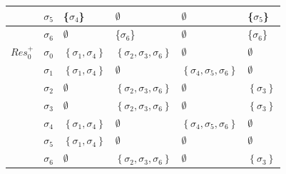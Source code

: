 \documentclass[11pt,a4paper]{article}
\begin{document}
\begin{table}[ht!]
\begin{tabular}{|l|l|l|l|l|l|}
     & $\sigma_5$ &  \{$\sigma_4$\}  & $\emptyset$ & $\emptyset$   &  \{$\sigma_5$\}  \\ \hline
     & $\sigma_6$ &  $\emptyset$  & \{$\sigma_6$\} & $\emptyset$   &  \{$\sigma_6$\} \\ \hline
$Res_0^+$ & $\sigma_0$ & $\left\{\sigma_1, \sigma_4\right\}$  & $\left\{\sigma_2, \sigma_3,\sigma_6\right\}$ & $\emptyset$ & $\emptyset$   \\ \hline
     & $\sigma_1$ &  $\left\{\sigma_1, \sigma_4\right\}$  & $\emptyset$ & $\left\{\sigma_4, \sigma_5,\sigma_6\right\}$  &  $\emptyset$  \\ \hline
     & $\sigma_2$ &  $\emptyset$  & $\left\{\sigma_2, \sigma_3,\sigma_6\right\}$ & $\emptyset$   &  $\left\{\sigma_3\right\}$ \\ \hline
     & $\sigma_3$ &  $\emptyset$  & $\left\{\sigma_2, \sigma_3,\sigma_6\right\}$ & $\emptyset$   &  $\left\{\sigma_3\right\}$ \\ \hline
     & $\sigma_4$ &  $\left\{\sigma_1, \sigma_4\right\}$  & $\emptyset$ & $\left\{\sigma_4, \sigma_5,\sigma_6\right\}$   &  $\emptyset$  \\ \hline
     & $\sigma_5$ &  $\left\{\sigma_1, \sigma_4\right\}$  & $\emptyset$ & $\emptyset$   &  $\emptyset$  \\ \hline
     & $\sigma_6$ &  $\emptyset$  & $\left\{\sigma_2, \sigma_3,\sigma_6\right\}$ & $\emptyset$   &  $\left\{\sigma_3\right\}$  \\ \hline
\end{tabular}
\end{table}
\end{document}
